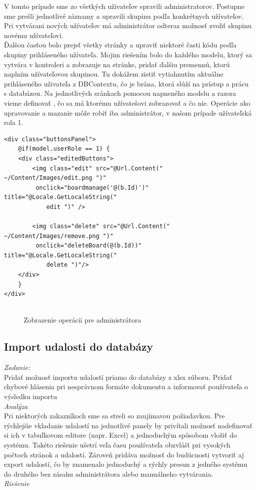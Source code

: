 \documentclass[11pt, oneside]{report}
\begin{document}
V tomto prípade sme zo všetkých uživateľov spravili administratorov. Postupne sme prešli jednotlivé záznamy a upravili skupinu podľa konkrétnych užívateľov. Pri vytvárani nových užívateľov má administrátor odteraz možnosť zvoliť skupinu novému užívateľovi.\\ Ďalšou časťou bolo prejsť všetky stránky a upraviť  niektoré časti kódu podľa skupiny prihláseného užívateľa. Mojim riešením bolo do každého modelu, ktorý sa vytvára v kontroleri a zobrazuje na stránke, pridať ďalšiu premennú, ktorú naplním užívateľovou skupinou. Tu dokážem zistiť vytiahnutím aktuálne prihláseného uživateľa z DBContextu, čo je brána, ktorá slúží na prístup a prácu s databázou. Na jednotlivých sránkach pomocou napneného modelu  a razora vieme definovať , čo sa má ktorému užívatešovi zobrazovať a čo nie. Operácie ako upravovanie a mazanie môže robiť iba administrátor, v našom prípade užívateľská rola 1. 
\lstset{language=HTML5}
\begin{lstlisting}
<div class="buttonsPanel">
    @if(model.userRole == 1) {
    <div class="editedButtons">
        <img class="edit" src="@Url.Content(" ~/Content/Images/edit.png ")"
         onclick="boardmanage('@(b.Id)')" title="@Locale.GetLocaleString("
            edit ")" />

        <img class="delete" src="@Url.Content(" ~/Content/Images/remove.png ")"
         onclick="deleteBoard(@(b.Id))" title="@Locale.GetLocaleString("
            delete ")"/>
    </div>
    }
</div>\end{lstlisting}
\begin{figure}[h]
    \centering
    \includegraphics[width=0.001\textwidth]{empty}
    \caption{Zobrazenie operácii pre administrátora}
    \label{fig:mesh1}
\end{figure}
\subsection*{Import udalosti do databázy}
\textit{Zadanie:}\\
Pridať možnosť importu udalostí priamo do databázy z xlsx súboru. Pridať  chybové hlásenia pri  nesprávnom formáte dokumentu a informovať používateľa o výsledku importu
\\\textit{Analýza}\\
Pri niektorých zakazníkoch sme sa streli so zaujímavou požiadavkou. Pre rýchlejšie vkladanie  udalostí na jednotlivé panely by privítali možnosť nadefinovať si ich   v tabuľkovom editore (napr. Excel) a jednoduchým spôsobom vložiť do systému. Takéto riešenie ušetrí veľa času používateľa obzvlášť pri vysokých počtoch stránok a udalostí. Zároveň pridáva možnosť  do budúcnosti vytvoriť aj export udalostí, čo by znamenalo  jednoduchý a rýchly presun z jedného systému do druhého bez zásahu administrátora alebo manuálneho vytvárania.
\\\textit{Riešenie}\\
\end{document}
